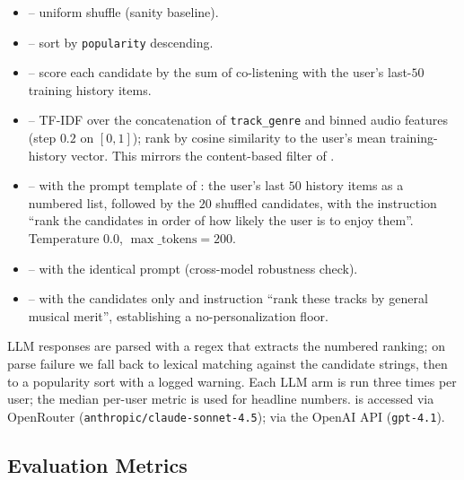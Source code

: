 \begin{itemize}[leftmargin=*,itemsep=0pt,topsep=0pt]
    \item \textbf{\randmethod} -- uniform shuffle (sanity baseline).
    \item \textbf{\popmethod} -- sort by \spotcat \texttt{popularity} descending.
    \item \textbf{\itemknn} -- score each candidate by the sum of co-listening with the user's last-$50$ training history items.
    \item \textbf{\cbf} -- TF-IDF over the concatenation of \texttt{track\_genre} and binned audio features (step $0.2$ on $[0,1]$); rank by cosine similarity to the user's mean training-history vector. This mirrors the content-based filter of \citet{boadana2025llm}.
    \item \textbf{\claudehist} -- \claude with the prompt template of \citet{hou2024llm}: the user's last $50$ history items as a numbered list, followed by the $20$ shuffled candidates, with the instruction ``rank the candidates in order of how likely the user is to enjoy them''. Temperature $0.0$, $\max\_\text{tokens}=200$.
    \item \textbf{\gpthist} -- \gpt with the identical prompt (cross-model robustness check).
    \item \textbf{\claudenohist} -- \claude with the candidates only and instruction ``rank these tracks by general musical merit'', establishing a no-personalization floor.
\end{itemize}
LLM responses are parsed with a regex that extracts the numbered ranking; on parse failure we fall back to lexical matching against the candidate strings, then to a popularity sort with a logged warning. Each LLM arm is run three times per user; the median per-user metric is used for headline numbers. \claude is accessed via OpenRouter (\texttt{anthropic/claude-sonnet-4.5}); \gpt via the OpenAI API (\texttt{gpt-4.1}).

\subsection{Evaluation Metrics}
\label{sec:metrics}

